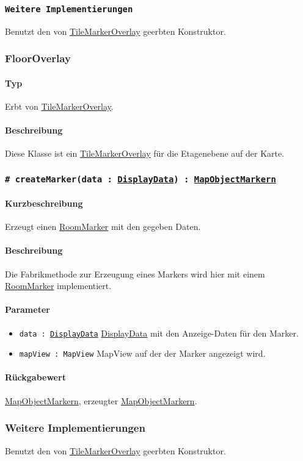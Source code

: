 \subsubsection*{\texttt{Weitere Implementierungen}}%
Benutzt den von \hyperref[App_Map_View_TileMarkerOverlay]{TileMarkerOverlay} geerbten Konstruktor.

\subsubsection{FloorOverlay}
\paragraph*{Typ}
Erbt von \hyperref[App_Map_View_TileMarkerOverlay]{TileMarkerOverlay}.
\paragraph*{Beschreibung}
Diese Klasse ist ein \hyperref[App_Map_View_TileMarkerOverlay]{TileMarkerOverlay} für die Etagenebene auf der Karte.

\subsubsection*{\texttt{\# createMarker(data : \hyperref[App_Map_Util_DisplayData]{DisplayData}) : \hyperref[App_Map_View_MapObjectMarker]{MapObjectMarkern}}}%
\paragraph*{Kurzbeschreibung}
Erzeugt einen \hyperref[App_Map_View_RoomMarker]{RoomMarker} mit den gegeben Daten.
\paragraph*{Beschreibung}
Die Fabrikmethode zur Erzeugung eines Markers wird hier mit einem \hyperref[App_Map_View_RoomMarker]{RoomMarker} implementiert.
\paragraph*{Parameter}
\begin{itemize}
    \item \texttt{data : \hyperref[App_Map_Util_DisplayData]{DisplayData}} \hyperref[App_Map_Util_DisplayData]{DisplayData} mit den Anzeige-Daten für den Marker.
    \item \texttt{mapView : MapView} MapView auf der der Marker angezeigt wird.
\end{itemize}
\paragraph*{Rückgabewert}
\hyperref[App_Map_View_MapObjectMarker]{MapObjectMarkern}, erzeugter \hyperref[App_Map_View_MapObjectMarker]{MapObjectMarkern}.

\subsubsection*{Weitere Implementierungen}%
Benutzt den von \hyperref[App_Map_View_TileMarkerOverlay]{TileMarkerOverlay} geerbten Konstruktor.